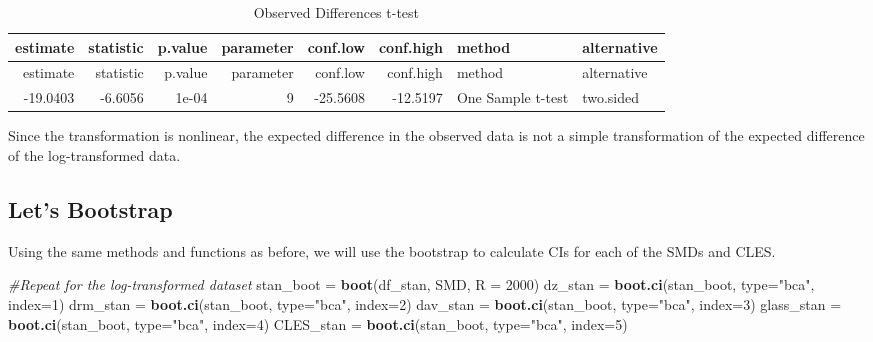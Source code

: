 \documentclass[]{tufte-handout}
\newenvironment{Shaded}{}{}
\newcommand{\CommentTok}[1]{\textcolor[rgb]{0.38,0.63,0.69}{\textit{#1}}}
\newcommand{\DataTypeTok}[1]{\textcolor[rgb]{0.56,0.13,0.00}{#1}}
\newcommand{\DecValTok}[1]{\textcolor[rgb]{0.25,0.63,0.44}{#1}}
\newcommand{\KeywordTok}[1]{\textcolor[rgb]{0.00,0.44,0.13}{\textbf{#1}}}
\newcommand{\NormalTok}[1]{#1}
\newcommand{\StringTok}[1]{\textcolor[rgb]{0.25,0.44,0.63}{#1}}
\begin{document}
\begin{longtable}[]{@{}rrrrrrll@{}}
\caption{Observed Differences t-test}\tabularnewline
\toprule
estimate & statistic & p.value & parameter & conf.low & conf.high &
method & alternative\tabularnewline
\midrule
\endfirsthead
\toprule
estimate & statistic & p.value & parameter & conf.low & conf.high &
method & alternative\tabularnewline
\midrule
\endhead
-19.0403 & -6.6056 & 1e-04 & 9 & -25.5608 & -12.5197 & One Sample t-test
& two.sided\tabularnewline
\bottomrule
\end{longtable}

Since the transformation is nonlinear, the expected difference in the
observed data is not a simple transformation of the expected difference
of the log-transformed data.

\hypertarget{lets-bootstrap-1}{%
\subsection{Let's Bootstrap}\label{lets-bootstrap-1}}

Using the same methods and functions as before, we will use the
bootstrap to calculate CIs for each of the SMDs and CLES.

\begin{Shaded}
\begin{Highlighting}[]
\CommentTok{#Repeat for the log-transformed dataset}
\NormalTok{stan_boot =}\StringTok{ }\KeywordTok{boot}\NormalTok{(df_stan, SMD, }\DataTypeTok{R =} \DecValTok{2000}\NormalTok{)}
\NormalTok{dz_stan =}\StringTok{ }\KeywordTok{boot.ci}\NormalTok{(stan_boot, }\DataTypeTok{type=}\StringTok{"bca"}\NormalTok{, }\DataTypeTok{index=}\DecValTok{1}\NormalTok{)}
\NormalTok{drm_stan =}\StringTok{ }\KeywordTok{boot.ci}\NormalTok{(stan_boot, }\DataTypeTok{type=}\StringTok{"bca"}\NormalTok{, }\DataTypeTok{index=}\DecValTok{2}\NormalTok{)}
\NormalTok{dav_stan =}\StringTok{ }\KeywordTok{boot.ci}\NormalTok{(stan_boot, }\DataTypeTok{type=}\StringTok{"bca"}\NormalTok{, }\DataTypeTok{index=}\DecValTok{3}\NormalTok{)}
\NormalTok{glass_stan =}\StringTok{ }\KeywordTok{boot.ci}\NormalTok{(stan_boot, }\DataTypeTok{type=}\StringTok{"bca"}\NormalTok{, }\DataTypeTok{index=}\DecValTok{4}\NormalTok{)}
\NormalTok{CLES_stan =}\StringTok{ }\KeywordTok{boot.ci}\NormalTok{(stan_boot, }\DataTypeTok{type=}\StringTok{"bca"}\NormalTok{, }\DataTypeTok{index=}\DecValTok{5}\NormalTok{)}
\end{Highlighting}
\end{Shaded}
\end{document}
